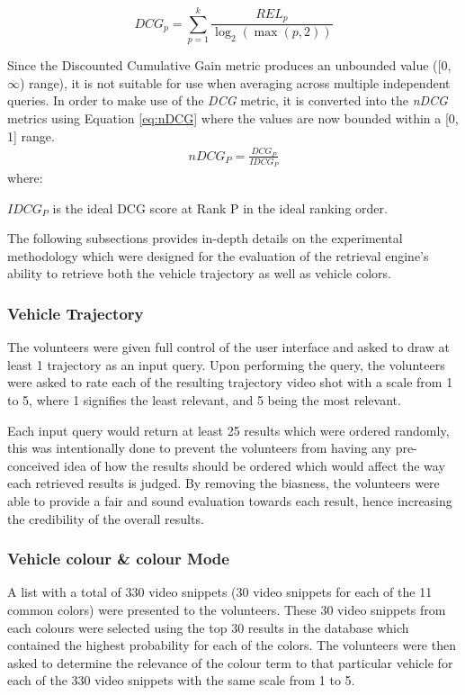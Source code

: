 \begin{equation}
\label{eq:DCGk}
DCG_p = \sum_{p=1}^k\frac{REL_{p}}{\log_2 (\max (p,2))}
\end{equation}


Since the Discounted Cumulative Gain metric produces an unbounded value ([0, $\infty$) range), it is not suitable for use when averaging across multiple independent queries. In order to make use of the \textit{DCG} metric, it is converted into the \textit{nDCG} metrics using Equation \ref{eq:nDCG} where the values are now bounded within a [0, 1] range.
\begin{align}
\label{eq:nDCG}
\textit{nDCG}_P = \frac{DCG_P}{IDCG_P} 
\end{align}
where: 

\hspace{2em} $IDCG_P$ is the ideal DCG score at Rank P in the ideal ranking order.

The following subsections provides in-depth details on the experimental methodology which were designed for the evaluation of the retrieval engine's ability to retrieve both the vehicle trajectory as well as vehicle colors. 


\subsubsection{Vehicle Trajectory}
 The volunteers were given full control of the user interface and asked to draw at least 1 trajectory as an input query. Upon performing the query, the volunteers were asked to rate each of the resulting trajectory video shot with a scale from 1 to 5, where 1 signifies the least relevant, and 5 being the most relevant. 
 
 Each input query would return at least 25 results which were ordered randomly, this was intentionally done to prevent the volunteers from having any pre-conceived idea of how the results should be ordered which would affect the way each retrieved results is judged. By removing the biasness, the volunteers were able to provide a fair and sound evaluation towards each result, hence increasing the credibility of the overall results.

 

\subsubsection{Vehicle colour \& colour Mode}
\label{subsec:vehColor}
A list with a total of 330 video snippets (30 video snippets for each of the 11 common colors) were presented to the volunteers. These 30 video snippets from each colours were selected using the top 30 results in the database which contained the highest probability for each of the colors. The volunteers were then asked to determine the relevance of the colour term to that particular vehicle for each of the 330 video snippets with the same scale from 1 to 5. 

